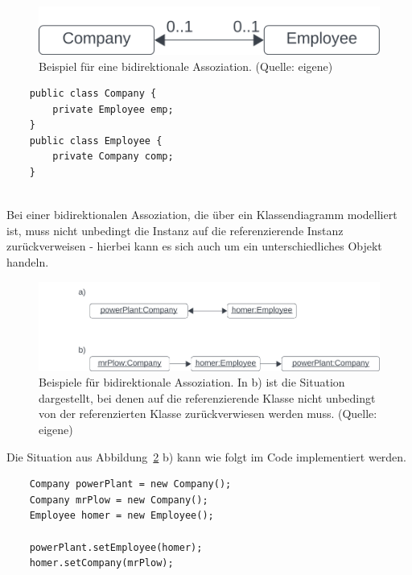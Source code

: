 \begin{figure}
    \centering
    \includegraphics[scale=0.5]{chapters/fopt3/img/bidirectionalassociation}
    \caption{Beispiel für eine bidirektionale Assoziation. (Quelle: eigene)}
    \label{fig:bidirectionalassociation}
\end{figure}


\begin{verbatim}
    public class Company {
        private Employee emp;
    }
    public class Employee {
        private Company comp;
    }
\end{verbatim}\\

\noindent
    Bei einer bidirektionalen Assoziation, die über ein Klassendiagramm modelliert ist, muss nicht unbedingt die Instanz auf die referenzierende Instanz zurückverweisen - hierbei kann es sich auch um ein unterschiedliches Objekt handeln.\\

\begin{figure}
    \centering
    \includegraphics[scale=0.5]{chapters/fopt3/img/bidirectionalassocexample}
    \caption{Beispiele für bidirektionale Assoziation. In b) ist die Situation dargestellt, bei denen auf die referenzierende Klasse nicht unbedingt von der referenzierten Klasse zurückverwiesen werden muss. (Quelle: eigene)}
    \label{fig:bidirectionalassocexample}
\end{figure}

\newpage
Die Situation aus Abbildung~\ref{fig:bidirectionalassocexample} b) kann wie folgt im Code implementiert werden.

\begin{verbatim}
    Company powerPlant = new Company();
    Company mrPlow = new Company();
    Employee homer = new Employee();

    powerPlant.setEmployee(homer);
    homer.setCompany(mrPlow);
\end{verbatim}\\

